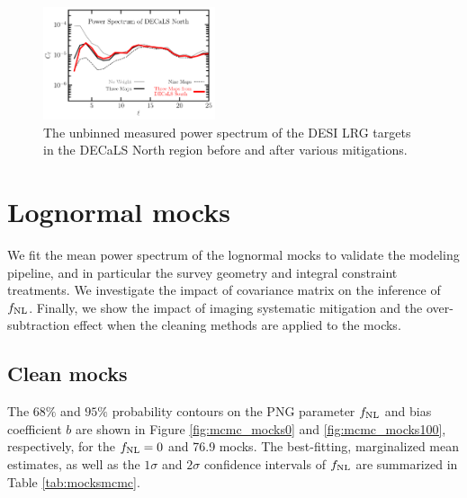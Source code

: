\begin{figure}
    \centering
    \includegraphics[width=0.45\textwidth]{figures/cl_SonN.pdf}
    \caption{The unbinned measured power spectrum of the DESI LRG targets in the DECaLS North region before and after various mitigations.}
    \label{fig:clSonN}
\end{figure}


\section{Lognormal mocks}
We fit the mean power spectrum of the lognormal mocks to validate the modeling pipeline, and in particular the survey geometry and integral constraint treatments. We investigate the impact of covariance matrix on the inference of $f_{\rm NL}$. Finally, we show the impact of imaging systematic mitigation and the over-subtraction effect when the cleaning methods are applied to the mocks. 

\subsection{Clean mocks}
The $68\%$ and $95\%$ probability contours on the PNG parameter $f_{\rm NL}$ and bias coefficient $b$ are shown in Figure \ref{fig:mcmc_mocks0} and \ref{fig:mcmc_mocks100}, respectively, for the $f_{\rm NL}=0$ and 76.9 mocks. The best-fitting, marginalized mean estimates, as well as the $1\sigma$ and $2\sigma$ confidence intervals of $f_{\rm NL}$ are summarized in Table \ref{tab:mocksmcmc}. 


